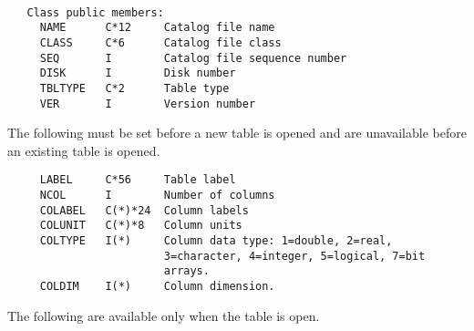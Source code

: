 {\small\begin{verbatim}

   Class public members:
     NAME      C*12     Catalog file name
     CLASS     C*6      Catalog file class
     SEQ       I        Catalog file sequence number
     DISK      I        Disk number
     TBLTYPE   C*2      Table type
     VER       I        Version number
\end{verbatim}}
   The following must be set before a new table is opened and are
   unavailable before an existing table is opened.
{\small\begin{verbatim}
     LABEL     C*56     Table label
     NCOL      I        Number of columns
     COLABEL   C(*)*24  Column labels
     COLUNIT   C(*)*8   Column units
     COLTYPE   I(*)     Column data type: 1=double, 2=real,
                        3=character, 4=integer, 5=logical, 7=bit
                        arrays.
     COLDIM    I(*)     Column dimension.
\end{verbatim}}
   The following are available only when the table is open.
